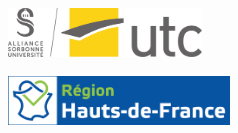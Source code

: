 \begin{titlepage}
\begin{center}
        \begin{figure}
            \begin{subfigure}[b]{0.3\linewidth}
                \centering
                \includegraphics[height=1.3cm]{Images/General/Logo_UTC.jpg}
            \end{subfigure}\hfill
            \begin{subfigure}[b]{0.3\linewidth}
                \centering
                \includegraphics[height=1.3cm]{Images/General/Logo Région HDF - partenaire.jpg}
            \end{subfigure}
        \end{figure}
    \end{center}
\end{titlepage}